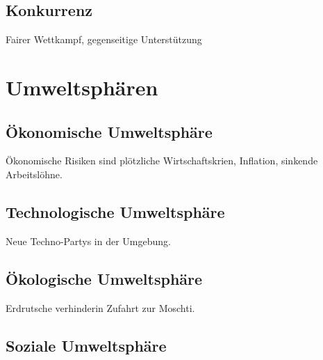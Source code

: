 \documentclass[a4paper, titlepage]{article}
\begin{document}
\subsection{Konkurrenz}
Fairer Wettkampf, gegenseitige Unterstützung

\section{Umweltsphären}
\subsection{Ökonomische Umweltsphäre}
Ökonomische Risiken sind plötzliche Wirtschaftskrien, Inflation, sinkende Arbeitslöhne.
\subsection{Technologische Umweltsphäre}
Neue Techno-Partys in der Umgebung.
\subsection{Ökologische Umweltsphäre}
Erdrutsche verhinderin Zufahrt zur Moschti.
\subsection{Soziale Umweltsphäre}
\end{document}
